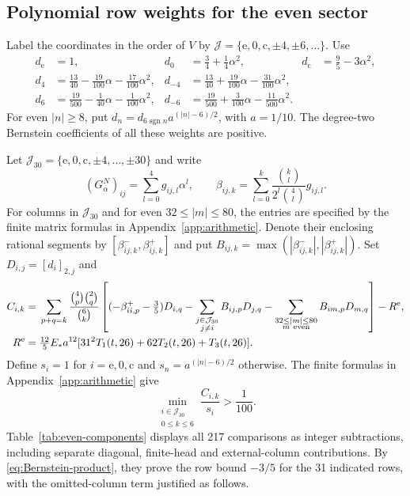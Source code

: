 \subsection{Polynomial row weights for the even sector}
Label the coordinates in the order of $V$ by $\mathcal J=\{\mathrm e,0,\mathrm c,\pm4,\pm6,\ldots\}$. Use
\begin{equation}\label{eq:even-weights}
\begin{aligned}
 d_{\mathrm e}&=1,&d_0&=\tfrac34+\tfrac14\alpha^2,&d_{\mathrm c}&=\tfrac95-3\alpha^2,\\
 d_4&=\tfrac{13}{40}-\tfrac{19}{100}\alpha-\tfrac{17}{100}\alpha^2,
 &d_{-4}&=\tfrac{13}{40}+\tfrac{19}{100}\alpha-\tfrac{31}{100}\alpha^2,\\
 d_6&=\tfrac{19}{500}-\tfrac1{40}\alpha-\tfrac1{100}\alpha^2,
 &d_{-6}&=\tfrac{19}{500}+\tfrac3{100}\alpha-\tfrac{11}{500}\alpha^2.
\end{aligned}
\end{equation}
For even $|n|\ge8$, put $d_n=d_{6\operatorname{sgn}n}a^{(|n|-6)/2}$, with $a=1/10$. The degree-two Bernstein coefficients of all these weights are positive.

Let $\mathcal J_{30}=\{\mathrm e,0,\mathrm c,\pm4,\ldots,\pm30\}$ and write
\[
 (G_\alpha^N)_{ij}=\sum_{l=0}^4g_{ij,l}\alpha^l,
 \qquad \beta_{ij,k}=\sum_{l=0}^k\frac{\binom kl}{2^l\binom4l}g_{ij,l}.
\]
For columns in $\mathcal J_{30}$ and for even $32\le|m|\le80$, the entries are specified by the finite matrix formulas in Appendix~\ref{app:arithmetic}. Denote their enclosing rational segments by $[\beta^-_{ij,k},\beta^+_{ij,k}]$ and put $B_{ij,k}=\max(|\beta^-_{ij,k}|,|\beta^+_{ij,k}|)$. Set $D_{i,j}=[d_i]_{2,j}$ and
\begin{equation}\label{eq:even-row-Bernstein}
\begin{aligned}
 C_{i,k}={}&\sum_{p+q=k}\frac{\binom4p\binom2q}{\binom6k}
 \left[(-\beta^+_{ii,p}-\tfrac35)D_{i,q}
 -\sum_{\substack{j\in\mathcal J_{30}\\j\ne i}}B_{ij,p}D_{j,q}
 -\sum_{\substack{32\le|m|\le80\\m\ \mathrm{even}}}B_{im,p}D_{m,q}\right]
 -R^{\rm e},\\
 R^{\rm e}={}&\tfrac{12}{5}E_*a^{12}
 [31^2T_1(t,26)+62T_2(t,26)+T_3(t,26)].
\end{aligned}
\end{equation}
Define $s_i=1$ for $i=\mathrm e,0,\mathrm c$ and $s_n=a^{(|n|-6)/2}$ otherwise. The finite formulas in Appendix~\ref{app:arithmetic} give
\begin{equation}\label{eq:even-uniform}
 \min_{\substack{i\in\mathcal J_{30}\\0\le k\le6}}\frac{C_{i,k}}{s_i}>\frac1{100}.
\end{equation}
Table~\ref{tab:even-components} displays all 217 comparisons as integer subtractions, including separate diagonal, finite-head and external-column contributions. By \eqref{eq:Bernstein-product}, they prove the row bound $-3/5$ for the 31 indicated rows, with the omitted-column term justified as follows.

